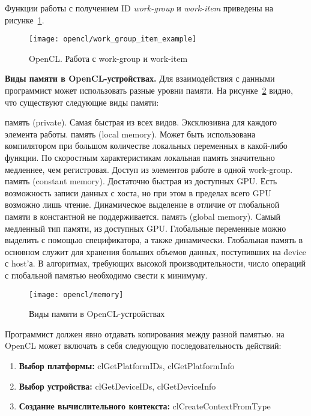 {	Функции работы с получением ID \textit{work-group} и \textit{work-item} приведены на рисунке~\ref{OpenCLWorkGroupItemExample:image}.
	\begin{figure}[H]
		\texttt{[image: opencl/work\_group\_item\_example]}
		\caption{OpenCL. Работа с work-group и work-item}
		\label{OpenCLWorkGroupItemExample:image}
	\end{figure}
	\par\textbf{Виды памяти в OpenCL-устройствах.} Для взаимодействия с данными программист может использовать разные уровни памяти. На рисунке~\ref{OpenCLMemory:image} видно, что существуют следующие виды памяти:
	\begin{itemize}
		 память (private). Самая быстрая из всех видов. Эксклюзивна для каждого элемента работы.
		 память (local memory). Может быть использована компилятором при большом количестве локальных переменных в какой-либо функции. По скоростным характеристикам локальная память значительно медленнее, чем регистровая. Доступ из элементов работе в одной work-group.
		 память (constant memory). Достаточно быстрая из доступных GPU. Есть возможность записи данных с хоста, но при этом в пределах всего GPU возможно лишь чтение. Динамическое выделение в отличие от глобальной памяти в константной не поддерживается.
		 память (global memory). Самый медленный тип памяти, из доступных GPU. Глобальные переменные можно выделить с помощью спецификатора, а также динамически. Глобальная память в основном служит для хранения больших объемов данных, поступивших на device с host’а. В алгоритмах, требующих высокой производительности, число операций с глобальной памятью необходимо свести к минимуму.
	\end{itemize}	
	\begin{figure}[H]
		\texttt{[image: opencl/memory]}
		\caption{Виды памяти в OpenCL-устройствах}
		\label{OpenCLMemory:image}
	\end{figure}
	Программист должен явно отдавать копирования между разной памятью.
	 на OpenCL может включать в себя следующую последовательность действий:
		\begin{enumerate}
			\item\textbf{Выбор платформы:} clGetPlatformIDs, clGetPlatformInfo
			\item\textbf{Выбор устройства:} clGetDeviceIDs, clGetDeviceInfo
			\item\textbf{Создание вычислительного контекста:} cl\-Create\-Context\-From\-Type

\end{enumerate}}
